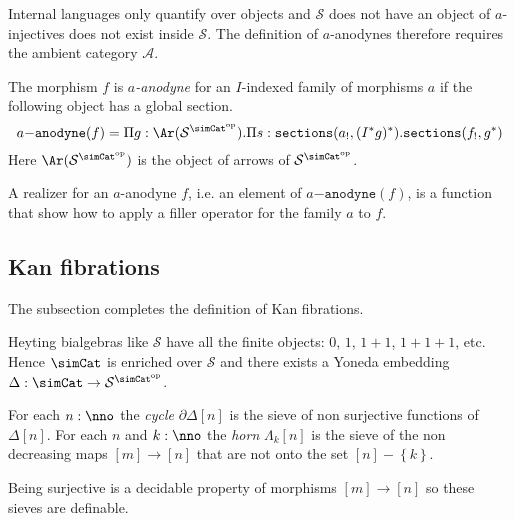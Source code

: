 \documentclass{tac}
\newcommand\hide[1]{}
\newcommand\cat\mathcal
\newcommand\set[1]{\left\{#1\right\}}
\newcommand\ri{^*}
\newcommand\dual{^{\mathrm{op}}}
\newcommand\s{^{\simCat\dual}}
\newcommand\of{:}
\newcommand\simplex\Delta
\newcommand\cycle{\partial\Delta}
\newcommand\horn\Lambda
\newcommand\code\mathtt
\begin{document}
\hide{Add?: These injectives satisfy the usual properties of closure under products, composition and pullback, thanks to specific constructions on filler operators.}

Internal languages only quantify over objects and $\cat S$ does not have an object of $a$-injectives does not exist inside $\cat S$. The definition of $a$-anodynes therefore requires the ambient category $\cat A$.

\begin{definition}
The morphism $f$ is \emph{$a$-anodyne} for an $I$-indexed family of morphisms $a$ if the following object has a global section.
\[ a\code{-anodyne}(f) = \Pi g\of \Ar(\cat S\s).\Pi s\of \code{sections}(a_!,(I\ri g)\ri).\code{sections}(f_!,g\ri) \]
Here $\Ar(\cat S\s)$ is the object of arrows of $\cat S\s$.
\end{definition}

A realizer for an $a$-anodyne $f$, i.e. an element of $a\code{-anodyne}(f)$, is a function that show how to apply a filler operator for the family $a$ to $f$.

\subsection{Kan fibrations}
The subsection completes the definition of Kan fibrations.

Heyting bialgebras like $\cat S$ have all the finite objects: $0$, $1$, $1+1$, $1+1+1$, etc. Hence $\simCat$ is enriched over $\cat S$ and there exists a Yoneda embedding $\Delta\of \simCat \to \cat S^{\simCat \dual}$. 

\begin{definition} For each $n\of \nno$ the \emph{cycle} $\cycle[n]$ is the sieve of non surjective functions of $\simplex[n]$. For each $n$ and $k\of\nno$ the \emph{horn} $\horn_k[n]$ is the sieve of the non decreasing maps $[m]\to [n]$ that are not onto the set $[n]-\set{k}$. 
\end{definition}

\hide{formulas for precision?}

Being surjective is a decidable property of morphisms $[m]\to[n]$ so these sieves are definable. 
\end{document}
